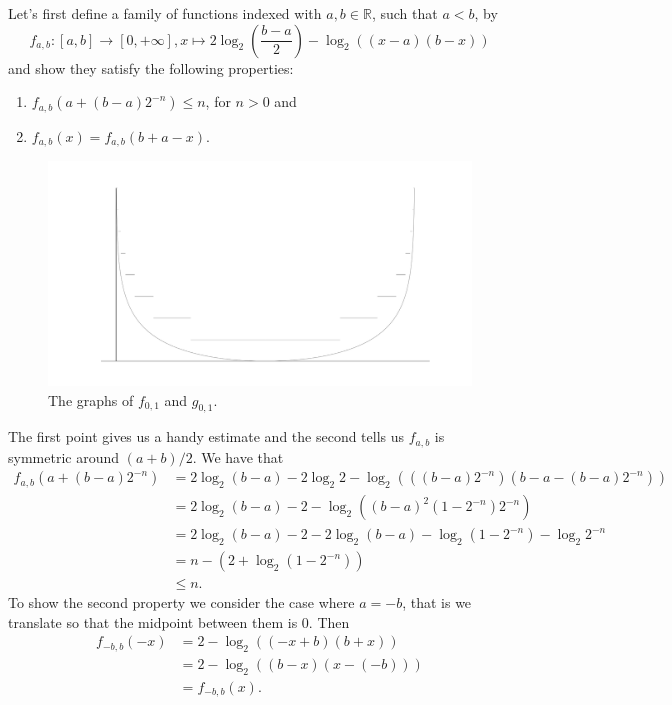 \documentclass[a4paper,12pt,twoside,BCOR=10mm]{scrbook}
\theoremstyle{definition}
\theoremstyle{definition}
\theoremstyle{definition}
\begin{document}
Let's first define a family of functions indexed with $a, b \in \mathbb{R}$, such that $a < b$, by
\[
\label{index30}
	f_{a, b}: [a, b] \rightarrow [0, +\infty],
	x \mapsto 2\log_2 \left ( \frac{b - a}{2} \right ) - \log_2((x - a)(b - x))
\]
and show they satisfy the following properties:
\begin{enumerate}
\item
$f_{a, b}(a + (b - a)2^{-n}) \leq n$, for $n > 0$ and
\item
$f_{a, b}(x) = f_{a, b}(b + a - x)$.
\end{enumerate}
\begin{figure}[h]
\centering
\includegraphics[width=1\textwidth]{graph2}
\caption{The graphs of $f_{0, 1}$ and $g_{0, 1}$.}
\end{figure}
The first point gives us a handy estimate and the second tells us $f_{a, b}$ is symmetric around $(a + b)/2$.
We have that
\begin{align*}
	f_{a, b}(a + (b - a)2^{-n})
	&= 2\log_2 (b - a) - 2\log_2 2 - \log_2 (((b - a)2^{-n})(b - a - (b - a)2^{-n}))\\
	&= 2\log_2 (b - a) - 2 - \log_2 ((b - a)^2(1 - 2^{-n})2^{-n})\\
	&= 2\log_2 (b - a) - 2 - 2\log_2 (b - a) - \log_2 (1 - 2^{-n}) - \log_2 2^{-n}\\
	&= n - (2 + \log_2 (1 - 2^{-n}))\\
	&\leq n.
\end{align*}
To show the second property we consider the case where $a = -b$, that is we translate so that the midpoint between them is $0$.
Then
\begin{align*}
f_{-b, b}(-x)
&= 2 - \log_2 ((-x + b)(b + x))\\
&= 2 - \log_2 ((b - x)(x - (-b)))\\
&= f_{-b, b}(x).
\end{align*}
\end{document}

